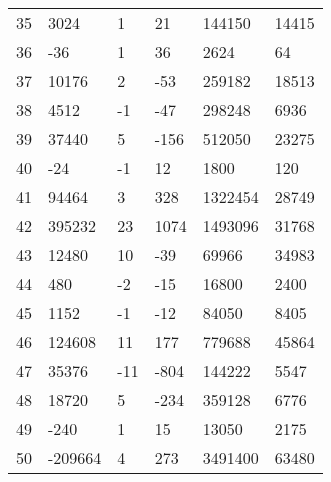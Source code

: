\documentclass{amsart}
\begin{document}
\begin{longtable}{llllll}
35 & 3024 & 1 & 21 & 144150 & 14415\\
36 & -36 & 1 & 36 & 2624 & 64\\
37 & 10176 & 2 & -53 & 259182 & 18513\\
38 & 4512 & -1 & -47 & 298248 & 6936\\
39 & 37440 & 5 & -156 & 512050 & 23275\\
40 & -24 & -1 & 12 & 1800 & 120\\
41 & 94464 & 3 & 328 & 1322454 & 28749\\
42 & 395232 & 23 & 1074 & 1493096 & 31768\\
43 & 12480 & 10 & -39 & 69966 & 34983\\
44 & 480 & -2 & -15 & 16800 & 2400\\
45 & 1152 & -1 & -12 & 84050 & 8405\\
46 & 124608 & 11 & 177 & 779688 & 45864\\
47 & 35376 & -11 & -804 & 144222 & 5547\\
48 & 18720 & 5 & -234 & 359128 & 6776\\
49 & -240 & 1 & 15 & 13050 & 2175\\
50 & -209664 & 4 & 273 & 3491400 & 63480\\
\hline
\end{longtable}
\end{document}
